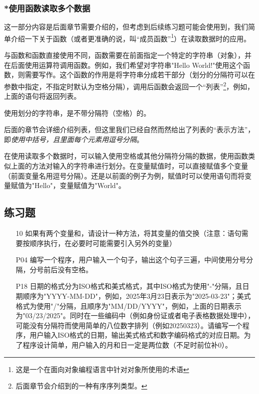 \subsubsection{*使用函数读取多个数据}

这一部分内容是后面章节需要介绍的，但考虑到后续练习题可能会使用到，我们简单介绍一下关于函数（或者更准确的说，叫“成员函数”\footnote{这是一个在面向对象编程语言中针对对象所使用的术语}）在读取数据时的应用。

与函数和函数直接使用不同，函数需要在前面指定一个特定的字符串（对象），并在后面使用运算符调用函数。例如，我们希望对字符串"Hello World!"使用这个函数，则需要写作。这个函数的作用是将字符串分成若干部分（划分的分隔符可以在参数中指定，不指定时默认为空格分隔），调用后函数会返回一个“列表”\footnote{后面章节会介绍到的一种有序序列类型。}，例如，上面的语句将返回列表。

\begin{attention}
    使用划分的字符串，是不带分隔符（空格）的。
\end{attention}

\begin{extend}
    后面的章节会详细介绍列表，但这里我们已经自然而然给出了列表的“表示方法”，即\emph{使用中括号，且里面每个元素用逗号分隔}。
\end{extend}

在使用读取多个数据时，可以输入使用空格或其他分隔符分隔的数据，使用函数类似上面的方法对输入的字符串进行划分。在变量赋值时，可以直接赋值多个变量（前面变量名用逗号分隔）。还是以前面的例子为例，赋值时可以使用语句而将变量赋值为"Hello"，变量赋值为"World"。

\subsection{练习题}\label{subsec:输入与输出-练习题}

\begin{itemize}
    \item [10] 如果有两个变量和，请设计一种方法，将其变量的值交换（注意：语句需要按顺序执行，在必要时可能需要引入另外的变量）
    \item [P04] 编写一个程序，用户输入一个句子，输出这个句子三遍，中间使用分号分隔，分号前后没有空格。
    \item [P18] 日期的格式分为ISO格式和美式格式，其中ISO格式为使用"-"分隔，且日期顺序为"YYYY-MM-DD"，例如，2025年3月23日表示为"2025-03-23"；美式格式为使用"/"分隔，且顺序为"MM/DD/YYYY"，例如，上面的日期表示为"03/23/2025"。同时在一些编码中（例如身份证或者电子表格数据处理中），可能没有分隔符而使用简单的八位数字排列（例如20250323）。请编写一个程序，用户输入ISO格式的日期，输出美式格式和数字编码格式的对应日期。为了程序设计简单，用户输入的月和日一定是两位数（不足时前位补0）。
\end{itemize}
